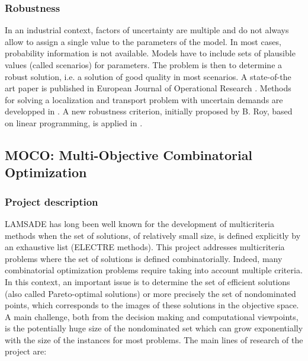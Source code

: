 \subsubsection{Robustness}


In an industrial context, factors of uncertainty are multiple and do not always allow to assign 
a single value to the parameters of the model. In most cases, probability information is not available. 
Models have to include sets of plausible values (called scenarios) for parameters. The problem 
is then to determine a robust solution, i.e. a solution of good quality in most scenarios. 
A state-of-the art paper is published  in European Journal of Operational Research 
\cite{DBLP:journals/eor/GabrelMT14}. 
Methods for solving  a localization and transport problem with uncertain demands are developped in \cite{DBLP:journals/dam/GabrelLMR14}. 
A new robustness criterion, initially 
proposed by B. Roy, based on linear programming, is applied in \cite{DBLP:journals/anor/GabrelMW13}.


\subsection{MOCO: Multi-Objective Combinatorial Optimization}


\subsubsection{Project description}

LAMSADE has long been well known for the development of multicriteria methods when the set of solutions, of relatively small size, is defined explicitly by an exhaustive list (ELECTRE methods). This project addresses multicriteria problems where the set of solutions is defined combinatorially. Indeed, many combinatorial optimization problems require taking into account multiple criteria. In this context, an important issue is to determine the set of efficient solutions (also called Pareto-optimal solutions) or more precisely the set of nondominated points, which corresponds to the images of these solutions in the objective space. A main challenge, both from the decision making and computational viewpoints, is the potentially huge size of the nondominated set which can grow exponentially with the size of the instances for most problems. The main lines of research of the project are:


